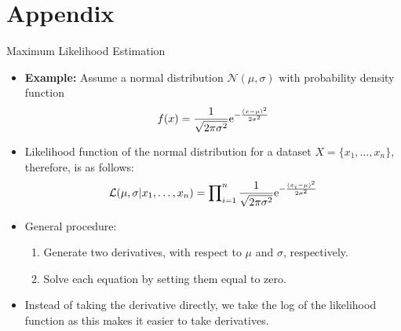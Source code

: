 \appendix
\section{Appendix}

\begin{frame}{Maximum Likelihood Estimation}
	\begin{itemize}
		\item \textbf{Example:} Assume a normal distribution $\mathcal{N}(\mu, \sigma)$ with probability density function
		      \begin{align*}
			      f(x)=\frac{1}{\sqrt{2\pi \sigma^2}} {\rm e}^{-\frac{(x-\mu)^2}{2\sigma^2}}
		      \end{align*}
		\item Likelihood function of the normal distribution for a dataset $X=\{x_1, \dots, x_n\}$, therefore, is as follows:
		      \vspace{-0.8em}
		      \begin{equation*}
			      \mathcal{L}(\mu, \sigma|x_1, \dots, x_n) = \prod\nolimits_{i=1}^n \frac{1}{\sqrt{2\pi \sigma^2}} {\rm e}^{-\frac{(x_i-\mu)^2}{2\sigma^2}}
		      \end{equation*}
		\item General procedure:
		      \begin{enumerate}
			      \item Generate two derivatives, with respect to $\mu$ and $\sigma$, respectively.
			      \item Solve each equation by setting them equal to zero.
		      \end{enumerate}
		\item Instead of taking the derivative directly, we take the log of the likelihood function as this makes it easier to take derivatives.
	\end{itemize}
\end{frame}

